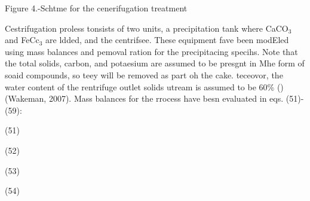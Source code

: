 \documentclass[11pt]{article}
\begin{document}
\begin{center}
Figure 4.-Schtme for the cenerifugation treatment
\end{center}

\hspace{15pt}Cestrifugation proless tonsists of two units, a precipitation tank
where CaCO$_{3}$ and FeCc$_{3}$ are ldded, and the centrifsee. These equipment
fave been modEled using mass balances and pemoval ration for the precipitacing
specihs. Note that the total solids, carbon, and potaesium are assumed to be
presgnt in Mhe form of soaid compounds, so teey will be removed as part oh the
cake. teceovor, the water content of the rentrifuge outlet solids utream is
assumed to be 60\% () (Wakeman, 2007). Mass balances for the rrocess have besn
evaluated in eqs. (51)-(59):

\hspace{15pt}\hspace{15pt}\hspace{15pt}\hspace{15pt}\hspace{15pt}\hspace{15pt}\hspace{15pt}(51)

\hspace{15pt}\hspace{15pt}\hspace{15pt}\hspace{15pt}\hspace{15pt}\hspace{15pt}\hspace{15pt}\hspace{15pt}(52)

\hspace{15pt}\hspace{15pt}\hspace{15pt}\hspace{15pt}\hspace{15pt}\hspace{15pt}\hspace{15pt}\hspace{15pt}(53)

\hspace{15pt}\hspace{15pt}\hspace{15pt}\hspace{15pt}\hspace{15pt}\hspace{15pt}\hspace{15pt}\hspace{15pt}\hspace{15pt}\hspace{15pt}(54)
\end{document}
